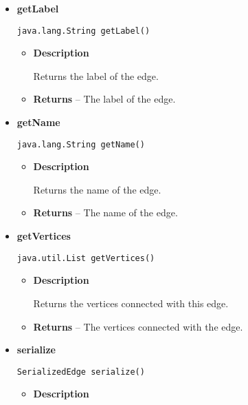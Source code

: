 {{{{{{\begin{itemize}
{\begin{itemize}
{Returns the ID of the edge.
}
\item{{\bf  Returns} -- 
The id of the edge. 
}%
\end{itemize}
}%
\item{ 
{\bf  getLabel}\\
\begin{lstlisting}[frame=none]
java.lang.String getLabel()\end{lstlisting} %
\begin{itemize}
\item{
{\bf  Description}

Returns the label of the edge.
}
\item{{\bf  Returns} -- 
The label of the edge. 
}%
\end{itemize}
}%
\item{ 
{\bf  getName}\\
\begin{lstlisting}[frame=none]
java.lang.String getName()\end{lstlisting} %
\begin{itemize}
\item{
{\bf  Description}

Returns the name of the edge.
}
\item{{\bf  Returns} -- 
The name of the edge. 
}%
\end{itemize}
}%
\item{ 
{\bf  getVertices}\\
\begin{lstlisting}[frame=none]
java.util.List getVertices()\end{lstlisting} %
\begin{itemize}
\item{
{\bf  Description}

Returns the vertices connected with this edge.
}
\item{{\bf  Returns} -- 
The vertices connected with the edge. 
}%
\end{itemize}
}%
\item{ 
{\bf  serialize}\\
\begin{lstlisting}[frame=none]
SerializedEdge serialize()\end{lstlisting} %
\begin{itemize}
\item{
{\bf  Description}

}
\end{itemize}}
\end{itemize}}}}}}}
